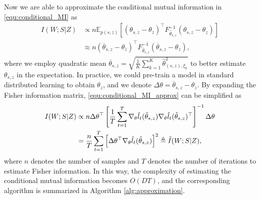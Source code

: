 \documentclass[lettersize,journal]{IEEEtran}
\newcommand{\E}{\mathbb{E}}
\theoremstyle{definition}
\theoremstyle{plain}
\begin{document}
Now we are able to approximate the conditional mutual information in \cref{equ:conditional_MI} as 
\begin{equation}
    \label{equ:conditional_MI_approx}
    \begin{split}
        I(W;S|Z) & \propto n \E_{p(s,z)}\left[\left(\theta_{s,z}-\theta_z\right)^{\top} {F}_{\hat{\theta}_{s,z}}^{-1}\left(\theta_{s,z}-\theta_z\right)\right] \\
        & \approx n \left(\overline{\theta}_{s,z}-\theta_z\right)^{\top} {F}_{\hat{\theta}_{s,z}}^{-1}\left(\overline{\theta}_{s,z}-\theta_z\right),
    \end{split}
\end{equation}
where we employ quadratic mean $\overline{\theta}_{s,z}=\sqrt{\frac{1}{K}\sum_{k=1}^K\hat{\theta}_{(s,z),{\xi}_k}^2}$ to better estimate $\theta_{s,z}$ in the expectation. In practice, we could pre-train a model in standard distributed learning to obtain $\theta_{z}$, and we denote $\Delta\theta = \overline{\theta}_{s,z}-\theta_z$. By expanding the Fisher information matrix, \cref{equ:conditional_MI_approx} can be simplified as
\begin{equation}
    \label{equ:conditional_MI_efficient}
    \begin{split}
        I(W;S|Z) & \propto n \Delta\theta^{\top} \left[\frac{1}{T}\sum_{t=1}^T\nabla_\theta \hat{l}_t(\hat{\theta}_{s,z})\nabla_\theta \hat{l}_t(\hat{\theta}_{s,z})^\top\right]^{-1}\Delta\theta \\
        & = \frac{n}{T}\sum_{t=1}^T\left[\Delta\theta^\top\nabla_\theta \hat{l}_t(\hat{\theta}_{s,z}) \right]^2\triangleq \Tilde{I}(W;S|Z),
    \end{split}
\end{equation}
where $n$ denotes the number of samples and $T$ denotes the number of iterations to estimate Fisher information. In this way, the complexity of estimating the conditional mutual information becomes $O(DT)$, and the corresponding algorithm is summarized in Algorithm \ref{alg:approximation}.
\end{document}
